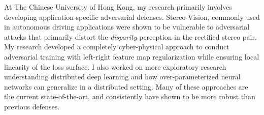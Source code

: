 \documentclass[12pt]{article}
\begin{document}
At The Chinese University of Hong Kong, my research primarily involves developing application-specific adversarial defenses. Stereo-Vision, commonly used in autonomous driving applications were shown to be vulnerable to adversarial attacks that primarily distort the \emph{disparity} perception in the rectified stereo pair. My research developed a completely cyber-physical approach to conduct adversarial training with left-right feature map regularization while ensuring local linearity of the loss surface. I also worked on more exploratory research understanding distributed deep learning and how over-parameterized neural networks can generalize in a distributed setting. Many of these approaches are the current state-of-the-art, and consistently have shown to be more robust than previous defenses.\\



\end{document}
